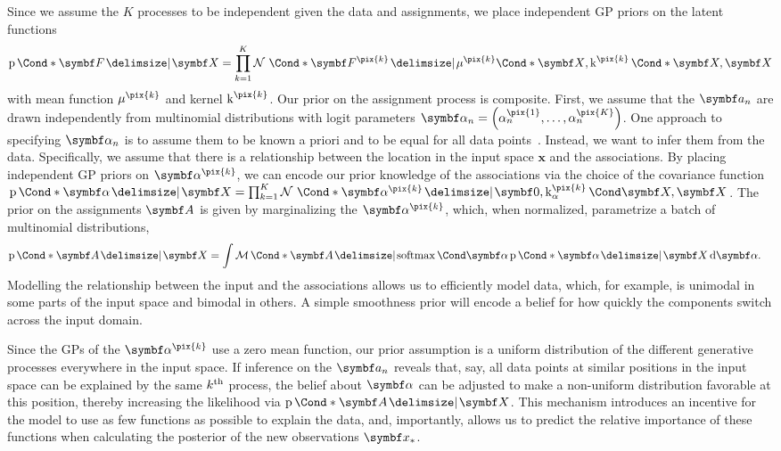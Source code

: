 Since we assume the $K$ processes to be independent given the data and assignments, we place independent GP priors on the latent functions
\begin{align}
    \begin{split}
        \Prob*{\mat{F} \given \mat{X}} = \prod_{k=1}^K \Gaussian*{\mat{F}^{\pix{k}} \given \Fun*{\mu^{\pix{k}}}{\mat{X}}, \Fun*{\K^{\pix{k}}}{\mat{X}, \mat{X}}}
    \end{split}
\end{align}
with mean function $\mu^{\pix{k}}$ and kernel $\K^{\pix{k}}$.
Our prior on the assignment process is composite.
First, we assume that the $\mat{a}_n$ are drawn independently from multinomial distributions with logit parameters $\mat{\alpha}_n = \left( \alpha_n^{\pix{1}}, \ldots, \alpha_n^{\pix{K}} \right)$.
One approach to specifying $\mat{\alpha}_n$ is to assume them to be known a priori and to be equal for all data points~\parencite{lazaro-gredilla_overlapping_2012}.
Instead, we want to infer them from the data.
Specifically, we assume that there is a relationship between the location in the input space $\mathbf{x}$ and the associations.
By placing independent GP priors on $\mat{\alpha}^{\pix{k}}$, we can encode our prior knowledge of the associations via the choice of the covariance function $\Prob*{\mat{\alpha} \given \mat{X}} = \prod_{k=1}^K \Gaussian*{\rv{\alpha}^{\pix{k}} \given \mat{0}, \Fun{\K_\alpha^{\pix{k}}}{\mat{X}, \mat{X}}}$.
The prior on the assignments $\mat{A}$ is given by marginalizing the $\mat{\alpha}^{\pix{k}}$, which, when normalized, parametrize a batch of multinomial distributions,
\begin{align}
    \begin{split}
        \label{eq:data_association:multinomial_likelihood}
        \Prob*{\mat{A} \given \mat{X}} &=
        \int
        \Multinomial*{\mat{A} \given \Fun{\softmax}{\mat{\alpha}}} \Prob*{\mat{\alpha} \given \mat{X}}
        \diff \rv{\alpha}.
    \end{split}
\end{align}
Modelling the relationship between the input and the associations allows us to efficiently model data, which, for example, is unimodal in some parts of the input space and bimodal in others.
A simple smoothness prior will encode a belief for how quickly the components switch across the input domain.

Since the GPs of the $\mat{\alpha}^{\pix{k}}$ use a zero mean function, our prior assumption is a uniform distribution of the different generative processes everywhere in the input space.
If inference on the $\mat{a}_n$ reveals that, say, all data points at similar positions in the input space can be explained by the same $k^{\text{th}}$ process, the belief about $\mat{\alpha}$ can be adjusted to make a non-uniform distribution favorable at this position, thereby increasing the likelihood via $\Prob*{\mat{A} \given \mat{X}}$.
This mechanism introduces an incentive for the model to use as few functions as possible to explain the data, and, importantly, allows us to predict the relative importance of these functions when calculating the posterior of the new observations $\mat{x}_\ast$.

